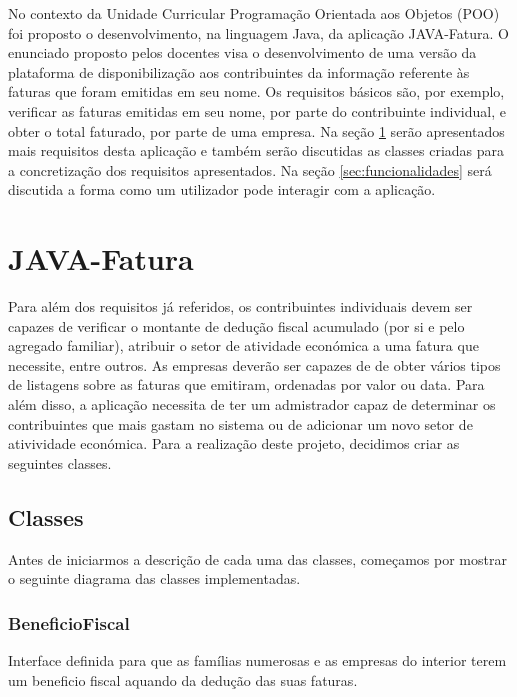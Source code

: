 \documentclass[a4paper]{article}
\begin{document}
 No contexto da Unidade Curricular Programação Orientada aos Objetos (POO) foi proposto o desenvolvimento, na linguagem Java, da
 aplicação JAVA-Fatura. O enunciado proposto pelos docentes visa o desenvolvimento de uma versão da plataforma de disponibilização aos contribuintes
 da informação referente às faturas que foram emitidas em seu nome. Os requisitos básicos são, por exemplo, verificar as faturas 
 emitidas em seu nome, por parte do contribuinte individual, e obter o total faturado, por parte de uma empresa.
 Na seção \ref{sec:java} serão apresentados mais requisitos desta aplicação e também serão discutidas as classes 
 criadas para a concretização dos requisitos apresentados.
 Na seção \ref{sec:funcionalidades} será discutida a forma como um utilizador pode interagir com a aplicação.


\section{JAVA-Fatura}
\label{sec:java}

Para além dos requisitos já referidos, os contribuintes individuais devem ser capazes de verificar o montante de dedução fiscal acumulado (por si
e pelo agregado familiar), atribuir o setor de atividade económica a uma fatura que necessite, entre outros. As empresas deverão ser capazes de de obter
vários tipos de listagens sobre as faturas que emitiram, ordenadas por valor ou data. Para além disso, a aplicação necessita de ter um admistrador capaz 
de determinar os contribuintes que mais gastam no sistema ou de adicionar um novo setor de ativividade económica. Para a realização deste projeto, decidimos
criar as seguintes classes.	
	

\subsection{Classes}
\label{sec:classes}

Antes de iniciarmos a descrição de cada uma das classes, começamos por mostrar o seguinte diagrama das classes implementadas.

	
\subsubsection{BeneficioFiscal} %


Interface definida para que as famílias numerosas e as empresas do interior
terem um beneficio fiscal aquando da dedução das suas faturas.
\end{document}
